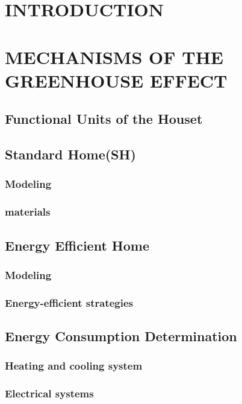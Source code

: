 \documentclass[oneside , 12pt , a4paper]{book}
\begin{document}
\renewcommand\contentsname{\hfill Contents \hfill}

\tableofcontents
\cleardoublepage
\mainmatter
\chapter{\large{INTRODUCTION}}
\chapter{\large{MECHANISMS OF THE GREENHOUSE EFFECT}} 
\section{Functional Units of the Houset}
\section{Standard Home(SH)}
\subsection{Modeling}
\subsection{materials}
\section{Energy Efficient Home}
\subsection{Modeling}
\subsection{Energy-efficient strategies}
\section{Energy Consumption Determination}
\subsection{Heating and cooling system}
\subsection{Electrical systems}
\end{document}
